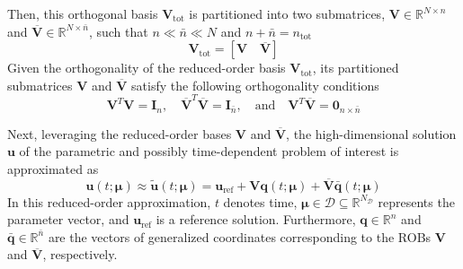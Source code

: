 \documentclass[preprint,10pt]{elsarticle}
\begin{document}
Then, this orthogonal basis $\mathbf{V}_\text{tot}$ is partitioned into two submatrices, $\mathbf{V} \in \mathbb{R}^{N \times n}$ and $\overline{\mathbf{V}} \in \mathbb{R}^{N \times \bar{n}}$, such that $n \ll \bar{n} \ll N$ and $n + \bar{n} = n_\text{tot}$
\begin{equation} 
	\mathbf{V}_\text{tot} = [\mathbf{V} \quad \overline{\mathbf{V}}]
\label{eq:Vtot}
\end{equation}
Given the orthogonality of the reduced-order basis $\mathbf{V}_\text{tot}$, its partitioned submatrices $\mathbf{V}$ and $\overline{\mathbf{V}}$ satisfy the following orthogonality conditions
\begin{equation} 
	\mathbf{V}^T \mathbf{V} = \mathbf{I}_n, \quad \overline{\mathbf{V}}^T \overline{\mathbf{V}} = \mathbf{I}_{\bar{n}}, \quad \text{and} \quad \mathbf{V}^T\overline{\mathbf{V}} = \mathbf{0}_{n \times \bar{n}}
	\label{eq:Orth}
\end{equation}

Next, leveraging the reduced-order bases $\mathbf{V}$ and $\overline{\mathbf{V}}$, the high-dimensional solution $\mathbf{u}$ of the parametric and possibly time-dependent problem of 
interest is approximated as
\begin{equation}
	\mathbf{u}(t; \boldsymbol{\mu}) \approx \tilde{\mathbf{u}}(t; \boldsymbol{\mu}) = \mathbf{u}_\text{ref} + \mathbf{V} \mathbf{q}(t; \boldsymbol{\mu}) + \overline{\mathbf{V}} \bar{\mathbf{q}}(t; \boldsymbol{\mu})
\label{eq:Apx1}
\end{equation}
In this reduced-order approximation, $t$ denotes time, $\boldsymbol{\mu} \in \mathcal{D} \subseteq \mathbb{R}^{N_\mathcal{D}}$ represents the parameter vector, and $\mathbf{u}_{\text{ref}}$ is a reference solution. Furthermore, $\mathbf{q} \in \mathbb{R}^n$ and $\bar{\mathbf{q}} \in \mathbb{R}^{\bar n}$ 
are the vectors of generalized coordinates corresponding to the ROBs $\mathbf{V}$ and $\overline{\mathbf{V}}$, respectively.
\end{document}

